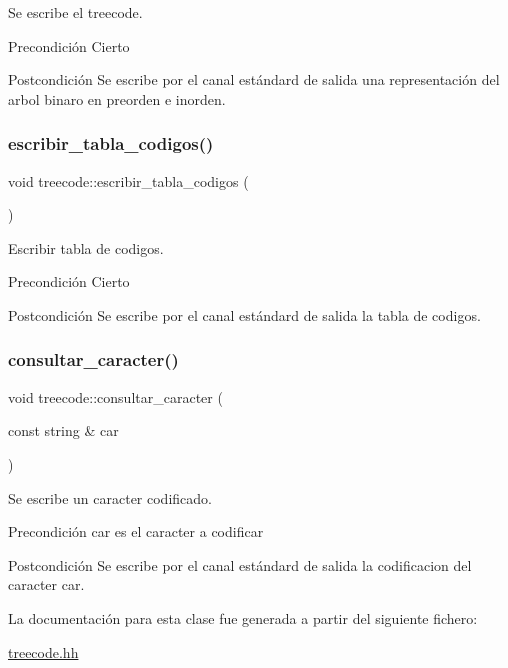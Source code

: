Se escribe el treecode. 

\begin{DoxyPrecond}{Precondición}
Cierto 
\end{DoxyPrecond}
\begin{DoxyPostcond}{Postcondición}
Se escribe por el canal estándard de salida una representación del arbol binaro en preorden e inorden. 
\end{DoxyPostcond}
\mbox{\label{classtreecode_ad56be1d26c0f852511b8ca0ce3f42cd3}} 
\subsubsection{\texorpdfstring{escribir\+\_\+tabla\+\_\+codigos()}{escribir\_tabla\_codigos()}}
{\footnotesize\ttfamily void treecode\+::escribir\+\_\+tabla\+\_\+codigos (\begin{DoxyParamCaption}{ }\end{DoxyParamCaption})}



Escribir tabla de codigos. 

\begin{DoxyPrecond}{Precondición}
Cierto 
\end{DoxyPrecond}
\begin{DoxyPostcond}{Postcondición}
Se escribe por el canal estándard de salida la tabla de codigos. 
\end{DoxyPostcond}
\mbox{\label{classtreecode_a83f608796a2a3fbbbe903bbb7e0448c3}} 
\subsubsection{\texorpdfstring{consultar\+\_\+caracter()}{consultar\_caracter()}}
{\footnotesize\ttfamily void treecode\+::consultar\+\_\+caracter (\begin{DoxyParamCaption}\item[{const string \&}]{car }\end{DoxyParamCaption})}



Se escribe un caracter codificado. 

\begin{DoxyPrecond}{Precondición}
car es el caracter a codificar 
\end{DoxyPrecond}
\begin{DoxyPostcond}{Postcondición}
Se escribe por el canal estándard de salida la codificacion del caracter car. 
\end{DoxyPostcond}


La documentación para esta clase fue generada a partir del siguiente fichero\+:\begin{DoxyCompactItemize}
\item 
\hyperlink{treecode_8hh}{treecode.\+hh}\end{DoxyCompactItemize}
